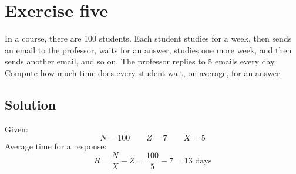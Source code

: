 \section{Exercise five}

In a course, there are 100 students. 
Each student studies for a week, then sends an email to the professor, waits for an answer, studies one more week, and then sends another email, and so on. 
The professor replies to 5 emails every day. 
Compute how much time does every student wait, on average, for an answer.

\subsection*{Solution}
Given:
\[N=100\qquad Z=7\qquad X=5\]
Average time for a response:
\[R=\dfrac{N}{X}-Z=\dfrac{100}{5}-7=13\text{ days}\]